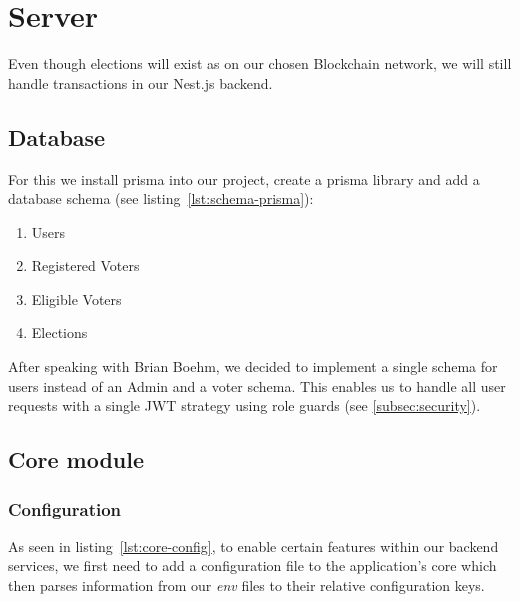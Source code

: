 \section{Server}\label{sec:server}

Even though elections will exist as  on our chosen \gls{Blockchain} network, we will still handle transactions in our Nest.js backend.

\subsection{Database}\label{subsec:database}


For this we install prisma into our project, create a prisma library and add a database schema (see listing~\ref{lst:schema-prisma}):

\begin{enumerate}
    \item Users
    \item Registered Voters
    \item Eligible Voters
    \item Elections
\end{enumerate}

After speaking with Brian Boehm, we decided to implement a single schema for users instead of an \gls{Admin} and a voter schema.
This enables us to handle all user requests with a single \gls{JWT} strategy using role guards (see \cref{subsec:security}).

\subsection{Core module}\label{subsec:core-module}

\subsubsection{Configuration}

As seen in listing~\ref{lst:core-config}, to enable certain features within our backend services, we first need to add a configuration file to the application's core which then parses information from our \emph{env} files to their relative configuration keys.


